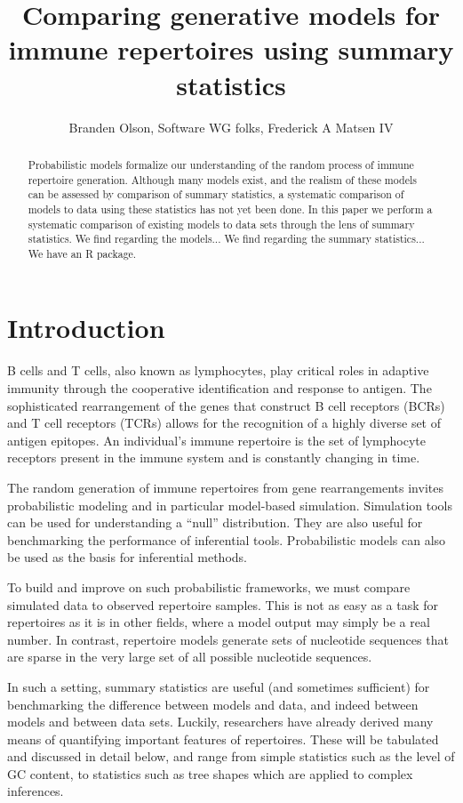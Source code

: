 \documentclass{article}
\title{Comparing generative models for immune repertoires using summary statistics}
\author{Branden Olson, Software WG folks, Frederick A Matsen IV}
\begin{document}
\maketitle

\begin{abstract}
Probabilistic models formalize our understanding of the random process of immune repertoire generation.
Although many models exist, and the realism of these models can be assessed by comparison of summary statistics, a systematic comparison of models to data using these statistics has not yet been done.
In this paper we perform a systematic comparison of existing models to data sets through the lens of summary statistics.
We find regarding the models...
We find regarding the summary statistics...
We have an R package.
\end{abstract}

\section*{Introduction}

B cells and T cells, also known as lymphocytes, play critical roles in adaptive immunity through the cooperative identification and response to antigen.
The sophisticated rearrangement of the genes that construct B cell receptors (BCRs) and T cell receptors (TCRs) allows for the recognition of a highly diverse set of antigen epitopes.
An individual's immune repertoire is the set of lymphocyte receptors present in the immune system and is constantly changing in time. 

The random generation of immune repertoires from gene rearrangements invites probabilistic modeling and in particular model-based simulation.
Simulation tools can be used for understanding a ``null'' distribution.
They are also useful for benchmarking the performance of inferential tools.
Probabilistic models can also be used as the basis for inferential methods.

To build and improve on such probabilistic frameworks, we must compare simulated data to observed repertoire samples.
This is not as easy as a task for repertoires as it is in other fields, where a model output may simply be a real number.
In contrast, repertoire models generate sets of nucleotide sequences that are sparse in the very large set of all possible nucleotide sequences.

In such a setting, summary statistics are useful (and sometimes sufficient) for benchmarking the difference between models and data, and indeed between models and between data sets.
Luckily, researchers have already derived many means of quantifying important features of repertoires.
These will be tabulated and discussed in detail below, and range from simple statistics such as the level of GC content, to statistics such as tree shapes which are applied to complex inferences.
\end{document}
